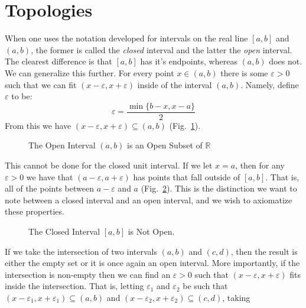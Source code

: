 \section{Topologies}
    When one uses the notation developed for intervals on the real line $[a,b]$
    and $(a,b)$, the former is called the \textit{closed} interval and the
    latter the \textit{open} interval. The clearest difference is that $[a,b]$
    has it's endpoints, whereas $(a,b)$ does not. We can generalize this
    further. For every point $x\in(a,b)$ there is some $\varepsilon>0$ such that
    we can fit $(x-\varepsilon,x+\varepsilon)$ inside of the interval $(a,b)$.
    Namely, define $\varepsilon$ to be:
    \begin{equation}
        \varepsilon=\frac{\min\{b-x,x-a\}}{2}
    \end{equation}
    From this we have $(x-\varepsilon,x+\varepsilon)\subseteq(a,b)$
    (Fig.~\ref{fig:Open_Interval_is_Open_Subset_of_R}).
    \begin{figure}[H]
        \centering
        \captionsetup{type=figure}
        
        \caption{The Open Interval $(a,b)$ is an Open Subset of $\mathbb{R}$}
        \label{fig:Open_Interval_is_Open_Subset_of_R}
    \end{figure}
    This cannot be done for the closed unit interval. If we let $x=a$, then for
    any $\varepsilon>0$ we have that $(a-\varepsilon,a+\varepsilon)$ has points
    that fall outside of $[a,b]$. That is, all of the points between
    $a-\varepsilon$ and $a$ (Fig.~\ref{fig:Closed_Interval_is_Not_Open}).
    This is the distinction we want to note between a closed interval
    and an open interval, and we wish to axiomatize these properties.
    \begin{figure}[H]
        \centering
        \captionsetup{type=figure}
        
        \caption{The Closed Interval $[a,b]$ is Not Open.}
        \label{fig:Closed_Interval_is_Not_Open}
    \end{figure}
    If we take the intersection of two intervals $(a,b)$ and $(c,d)$, then the
    result is either the empty set or it is once again an open interval. More
    importantly, if the intersection is non-empty then we can find an
    $\varepsilon>0$ such that $(x-\varepsilon,x+\varepsilon)$ fits inside the
    intersection. That is, letting $\varepsilon_{1}$ and $\varepsilon_{2}$ be
    such that $(x-\varepsilon_{1},x+\varepsilon_{1})\subseteq(a,b)$ and
    $(x-\varepsilon_{2},x+\varepsilon_{2})\subseteq(c,d)$, taking
